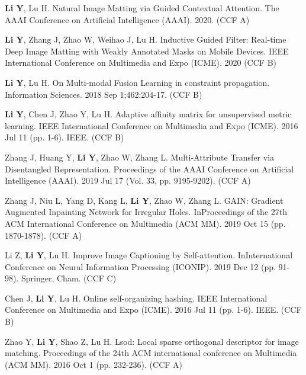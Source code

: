 

\begin{publications}
  \item {\bf{Li Y}}, Lu H. Natural Image Matting via Guided Contextual Attention. The AAAI Conference on Artificial Intelligence (AAAI). 2020. (CCF A)
  \item {\bf{Li Y}}, Zhang J, Zhao W, Weihao J, Lu H. Inductive Guided Filter: Real-time Deep Image Matting with Weakly Annotated Masks on Mobile Devices. IEEE International Conference on Multimedia and Expo (ICME). 2020  (CCF B)
  \item {\bf{Li Y}}, Lu H. On Multi-modal Fusion Learning in constraint propagation. Information Sciences. 2018 Sep 1;462:204-17. (CCF B)
  \item {\bf{Li Y}}, Chen J, Zhao Y, Lu H. Adaptive affinity matrix for unsupervised metric learning. IEEE International Conference on Multimedia and Expo (ICME). 2016 Jul 11 (pp. 1-6). IEEE. (CCF B)
  \item Zhang J, Huang Y, {\bf{Li Y}}, Zhao W, Zhang L. Multi-Attribute Transfer via Disentangled Representation. Proceedings of the AAAI Conference on Artificial Intelligence (AAAI). 2019 Jul 17 (Vol. 33, pp. 9195-9202). (CCF A)
  \item Zhang J, Niu L, Yang D, Kang L, {\bf{Li Y}}, Zhao W, Zhang L. GAIN: Gradient Augmented Inpainting Network for Irregular Holes. InProceedings of the 27th ACM International Conference on Multimedia (ACM MM). 2019 Oct 15 (pp. 1870-1878). (CCF A)
  \item Li Z, {\bf{Li Y}}, Lu H. Improve Image Captioning by Self-attention. InInternational Conference on Neural Information Processing (ICONIP). 2019 Dec 12 (pp. 91-98). Springer, Cham. (CCF C)
  \item Chen J, {\bf{Li Y}}, Lu H. Online self-organizing hashing. IEEE International Conference on Multimedia and Expo (ICME). 2016 Jul 11 (pp. 1-6). IEEE. (CCF B)
  \item Zhao Y, {\bf{Li Y}}, Shao Z, Lu H. Lsod: Local sparse orthogonal descriptor for image matching. Proceedings of the 24th ACM international conference on Multimedia (ACM MM). 2016 Oct 1 (pp. 232-236). (CCF A)
\end{publications}


